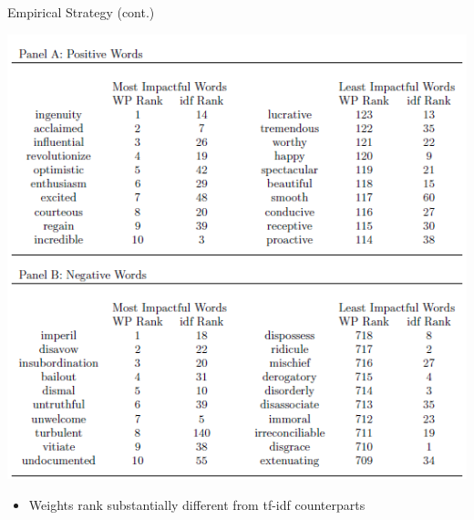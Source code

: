 \documentclass[english]{beamer}
\begin{document}
\begin{frame}{Empirical Strategy (cont.)}
\vspace{-7pt}
\begin{center}
\includegraphics[scale=0.5]{Images/jegadeesh2013-2.png}
\begin{itemize}
    \item Weights rank substantially different from tf-idf counterparts 
\end{itemize}
\end{center}
\end{frame}
\end{document}

